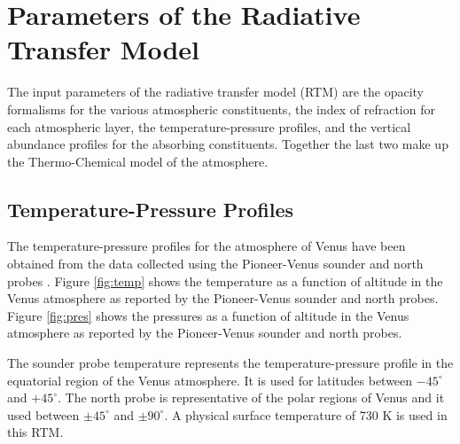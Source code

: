 \section{Parameters of the Radiative Transfer Model}
The input parameters of the radiative transfer model (RTM) are the opacity formalisms for the various atmospheric constituents, the index of refraction for each atmospheric layer, the temperature-pressure profiles, and the vertical abundance profiles for the absorbing constituents. Together the last two make up the Thermo-Chemical model of the atmosphere.
\subsection{Temperature-Pressure Profiles}
The temperature-pressure profiles for the atmosphere of Venus have been obtained from the data collected using the Pioneer-Venus sounder and north probes \cite{Seiff-1980}. Figure \ref{fig:temp} shows the temperature as a function of altitude in the Venus atmosphere as reported by the Pioneer-Venus sounder and north probes. Figure \ref{fig:pres} shows the pressures as a function of altitude in the Venus atmosphere as reported by the Pioneer-Venus sounder and north probes.

The sounder probe temperature represents the temperature-pressure profile in the equatorial region of the Venus atmosphere. It is used for latitudes between $-45^\circ$ and $+45^\circ$. The north probe is representative of the polar regions of Venus and it used between $\pm 45^\circ$ and $\pm90^\circ$. A physical surface temperature of 730 K is used in this RTM.

